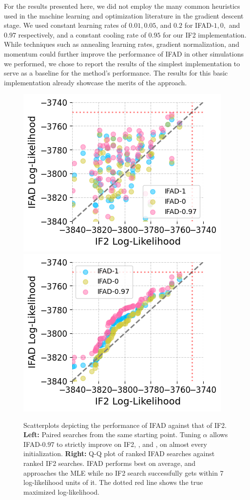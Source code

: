 \documentclass[9pt,twocolumn,pnasresearcharticle]{pnas-new}
\newcommand\arxiv[2]{#2} %
\begin{document}
For the results presented here, we did not employ the many common heuristics used in the machine learning and optimization literature in the gradient descent stage.
We used constant learning rates of $0.01, 0.05$, and $0.2$ for IFAD-$1,0,$ and $0.97$ respectively, and a constant cooling rate of $0.95$ for our IF2 implementation.
While techniques such as annealing learning rates, gradient normalization, and momentum could further improve the performance of IFAD in other simulations we performed, we chose to report the results of the simplest implementation to serve as a baseline for the method's performance.
The results for this basic implementation already showcase the merits of the approach.

\begin{figure}[htbp!]
    \includegraphics[width=\arxiv{8cm}{\textwidth/\real{4.2}}]{imgs/095/pairs.png}
    \includegraphics[width=\arxiv{8cm}{\textwidth/\real{4.2}}]{imgs/095/qq.png}
    \caption{Scatterplots depicting the performance of IFAD against that of IF2. \textbf{Left:} Paired searches from the same starting point. Tuning $\alpha$ allows IFAD-$0.97$ to strictly improve on IF2, \cite{poyiadjis11}, and \cite{naesseth18}, on almost every initialization. \textbf{Right:} Q-Q plot of ranked IFAD searches against ranked IF2 searches. IFAD performs best on average, and approaches the MLE while no IF2 search successfully gets within 7 log-likelihood units of it. The dotted red line shows the true maximized log-likelihood. }
    \label{fig:scatter}
    \arxiv{}{\vspace*{-4mm}}
\end{figure}
\end{document}
